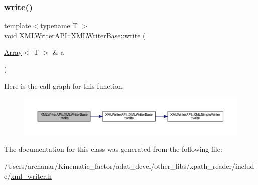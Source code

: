 \subsubsection{\texorpdfstring{write()}{write()}\hspace{0.1cm}{\footnotesize\ttfamily [26/26]}}
{\footnotesize\ttfamily template$<$typename T $>$ \\
void X\+M\+L\+Writer\+A\+P\+I\+::\+X\+M\+L\+Writer\+Base\+::write (\begin{DoxyParamCaption}\item[{\mbox{\hyperlink{classXMLArray_1_1Array}{Array}}$<$ T $>$ \&}]{a }\end{DoxyParamCaption})\hspace{0.3cm}{\ttfamily [inline]}}

Here is the call graph for this function\+:
\nopagebreak
\begin{figure}[H]
\begin{center}
\leavevmode
\includegraphics[width=350pt]{d5/df5/classXMLWriterAPI_1_1XMLWriterBase_a5475e21d716c65a21d620b4cde0c9ca1_cgraph}
\end{center}
\end{figure}


The documentation for this class was generated from the following file\+:\begin{DoxyCompactItemize}
\item 
/\+Users/archanar/\+Kinematic\+\_\+factor/adat\+\_\+devel/other\+\_\+libs/xpath\+\_\+reader/include/\mbox{\hyperlink{other__libs_2xpath__reader_2include_2xml__writer_8h}{xml\+\_\+writer.\+h}}\end{DoxyCompactItemize}

